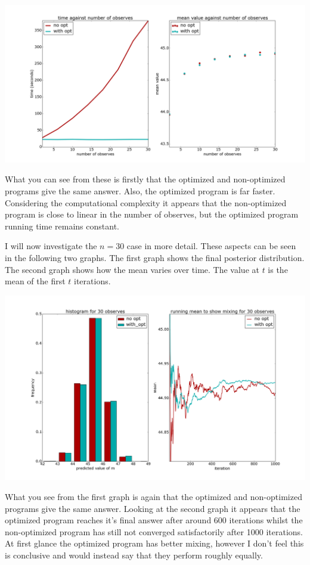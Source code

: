 \documentclass[a4paper]{article}
\begin{document}
\centerline{\includegraphics[width=16cm]{images/merging_observes_1.png}}

What you can see from these is firstly that the optimized and non-optimized programs give the same answer. Also, the optimized program is far faster. Considering the computational complexity it appears that the non-optimized program is close to linear in the number of observes, but the optimized program running time remains constant.

I will now investigate the \(n = 30\) case in more detail. These aspects can be seen in the following two graphs. The first graph shows the final posterior distribution. The second graph shows how the mean varies over time. The value at \(t\) is the mean of the first \(t\) iterations.

\centerline{\includegraphics[width=16cm]{images/merging_observes_2.png}}

What you see from the first graph is again that the optimized and non-optimized programs give the same answer. Looking at the second graph it appears that the optimized program reaches it's final answer after around 600 iterations whilst the non-optimized program has still not converged satisfactorily after 1000 iterations. At first glance the optimized program has better mixing, however I don't feel this is conclusive and would instead say that they perform roughly equally.
\end{document}
